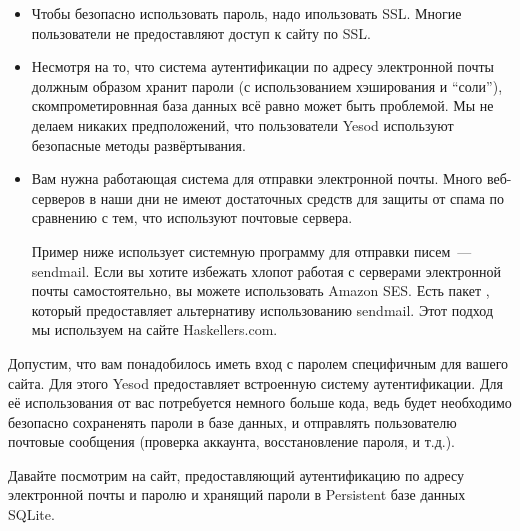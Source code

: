 \begin{itemize}
    \item Чтобы безопасно использовать пароль, надо ипользовать SSL. Многие пользователи не предоставляют доступ к сайту по SSL.

    \item Несмотря на то, что система аутентификации по адресу электронной почты должным образом хранит пароли (с использованием хэширования и ``соли''), скомпрометировнная база данных всё равно может быть проблемой. Мы не делаем никаких предположений, что пользователи Yesod используют безопасные методы развёртывания.

    \item Вам нужна работающая система для отправки электронной почты. Много веб-серверов в наши дни не имеют достаточных средств для защиты от спама по сравнению с тем, что используют почтовые сервера.

    \begin{remark}
    Пример ниже использует системную программу для отправки писем~--- sendmail. Если вы хотите избежать хлопот работая с серверами электронной почты самостоятельно, вы можете использовать Amazon SES. Есть пакет , который предоставляет альтернативу использованию sendmail. Этот подход мы используем на сайте Haskellers.com.
    \end{remark}
\end{itemize}

Допустим, что вам понадобилось иметь вход с паролем специфичным для вашего сайта. Для этого Yesod предоставляет встроенную систему аутентификации. Для её использования от вас потребуется немного больше кода, ведь будет необходимо безопасно сохраненять пароли в базе данных, и отправлять пользователю почтовые сообщения (проверка аккаунта, восстановление пароля, и т.д.).

Давайте посмотрим на сайт, предоставляющий аутентификацию по адресу электронной почты и паролю и хранящий пароли в Persistent базе данных SQLite.

